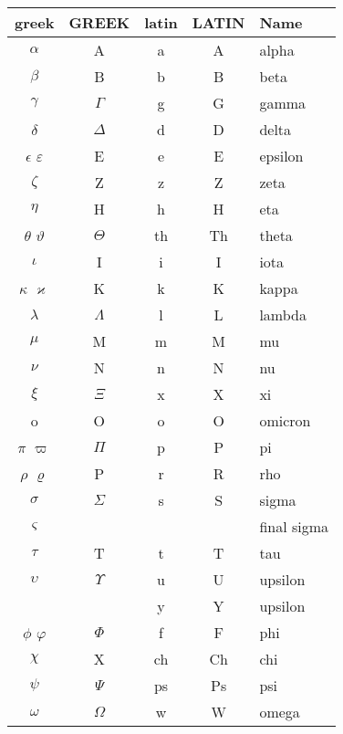 \begin{center}
	\begin{tabular}{ccccl}
				greek		&	GREEK		&	latin	&	LATIN	&	Name
\\\hline\hline
				$\alpha$	&	A			&	a		&	A		&	alpha
		\\		$\beta$		&	B			&	b		&	B	&	beta
		\\		$\gamma$	&	$\Gamma$	&	g		&	G	&	gamma
		\\		$\delta$	&	$\Delta$	&	d		&	D	&	delta
		\\		$\epsilon$	
				$\varepsilon$&	E			&	e		&	E	&	epsilon
		\\		$\zeta$		&	Z			&	z		&	Z	&	zeta
		\\		$\eta$		&	H			&	h		&	H	&	eta
		\\		$\theta$	
				$\vartheta$	&	$\Theta$	&	th		&	Th	&	theta
		\\		$\iota$		&	I			&	i		&	I	&	iota
		\\		$\kappa$	
				$\varkappa$	&	K			&	k		&	K	&	kappa
		\\		$\lambda$	&	$\Lambda$	&	l		&	L	&	lambda
		\\		$\mu$		&	M			&	m		&	M	&	mu
		\\		$\nu$		&	N			&	n		&	N	&	nu
		\\		$\xi$		&	$\Xi$		&	x		&	X	&	xi
		\\		o			&	O			&	o		&	O	&	omicron
		\\		$\pi$		
				$\varpi$	&	$\Pi$		&	p		&	P	&	pi
		\\		$\rho$		
				$\varrho$	&	P			&	r		&	R	&	rho
		\\		$\sigma$	&	$\Sigma$	&	s		&	S	&	sigma
		\\		$\varsigma$	&				&			&		&	final sigma
		\\		$\tau$		&	T			&	t		&	T	&	tau
		\\		$\upsilon$	&	$\Upsilon$	&	u		&	U	&	upsilon
		\\					&				&	y		&	Y	&	upsilon
		\\		$\phi$		
				$\varphi$	&	$\Phi$		&	f		&	F	&	phi
		\\		$\chi$		&	X			&	ch		&	Ch	&	chi
		\\		$\psi$		&	$\Psi$		&	ps		&	Ps	&	psi
		\\		$\omega$	&	$\Omega$	&	w		&	W	&	omega
		\\\hline
	\end{tabular}

	\vspace{3ex}
\end{center}


